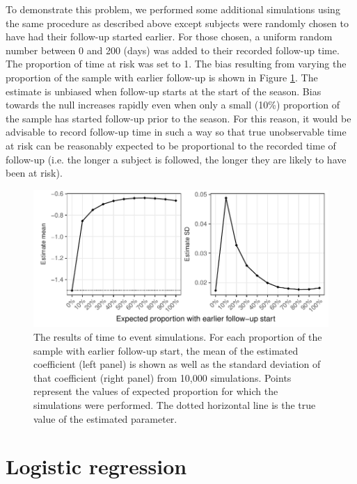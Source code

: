 \documentclass[12pt]{article}
\begin{document}

To demonstrate this problem, we performed some additional simulations using the same procedure as described above except subjects were randomly chosen to have had their follow-up started earlier. For those chosen, a uniform random number between 0 and 200 (days) was added to their recorded follow-up time. The proportion of time at risk was set to 1. The bias resulting from varying the proportion of the sample with earlier follow-up is shown in Figure \ref{CoxSimLong}. The estimate is unbiased when follow-up starts at the start of the season. Bias towards the null increases rapidly even when only a small (10\%) proportion of the sample has started follow-up prior to the season. For this reason, it would be advisable to record follow-up time in such a way so that true unobservable time at risk can be reasonably expected to be proportional to the recorded time of follow-up (i.e. the longer a subject is followed, the longer they are likely to have been at risk).

\begin{figure}[htp]
	\centering
	\includegraphics[width=1\textwidth]{../cox-tarprop-plot/long.pdf}
	\caption{
	The results of time to event simulations. For each proportion of the sample with earlier follow-up start, the mean of the estimated coefficient (left panel) is shown as well as the standard deviation of that coefficient (right panel) from 10,000 simulations. Points represent the values of expected proportion for which the simulations were performed. The dotted horizontal line is the true value of the estimated parameter.
	}
	\label{CoxSimLong}
\end{figure}

\section{Logistic regression}
\end{document}
